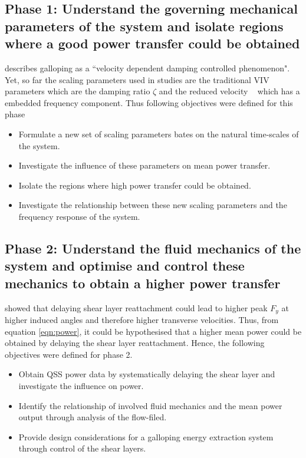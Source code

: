  \subsection*{Phase 1: Understand the governing mechanical parameters of the system and isolate regions where a good power transfer could be obtained}
 
 \citet{Paidoussis2010} describes galloping as a ``velocity dependent damping controlled phenomenon". Yet, so far the scaling parameters used in studies are the traditional VIV parameters which are the damping ratio $\zeta$ and the reduced velocity \ustar\ \citep{Barrero-Gil2010a} which has a embedded frequency component. Thus following objectives were defined for this phase 
 
 \begin{itemize}
\item Formulate a new set of scaling parameters bates on the natural time-scales of the system.
\item Investigate the influence of these parameters on mean power transfer.
\item Isolate the regions where high power transfer could be obtained.
\item Investigate the relationship between these new scaling parameters and the frequency response of the system. 
 \end{itemize}
 
    
  \subsection*{Phase 2: Understand the fluid mechanics of the system and optimise and control these mechanics to obtain a higher power transfer}
  
  \citet{Luo1994} showed that delaying shear layer reattachment could lead to higher peak $F_{y}$ at higher induced angles and therefore higher transverse velocities. Thus, from equation \ref{eqn:power}, it could be hypothesised that a higher mean power could be obtained by delaying the shear layer reattachment. Hence, the following objectives were defined for phase 2. 
  
  \begin{itemize}
  	\item Obtain QSS power data by systematically delaying the shear layer and investigate the influence on power.
  	\item Identify the relationship of involved fluid mechanics and the mean power output through analysis of the flow-filed.
  	\item Provide design considerations for a galloping energy extraction system through control of the shear layers. 
  \end{itemize}
 
